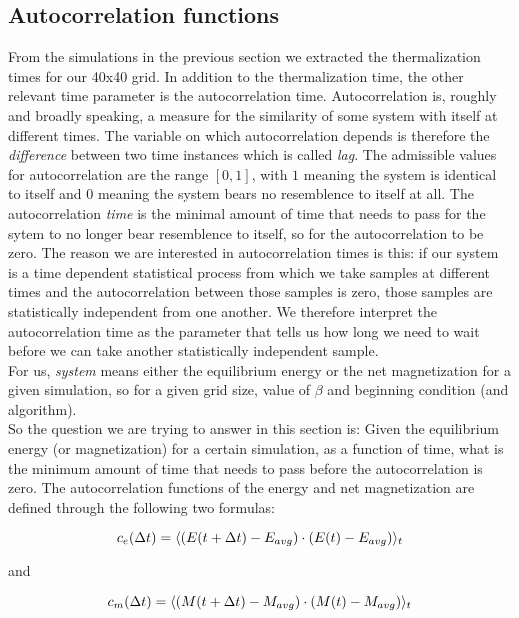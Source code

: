\documentclass[11pt,a4paper]{article}
\DeclarePairedDelimiter{\avg}{\langle}{\rangle}
\begin{document}
\subsection{Autocorrelation functions}
From the simulations in the previous section we extracted the thermalization times for our 40x40 grid. In addition to the thermalization
 time, the other relevant time parameter is the autocorrelation time. Autocorrelation is, roughly and broadly speaking, a measure for the
 similarity of some system with itself at different times. The variable on which autocorrelation depends is therefore the \textit{difference}
 between two time instances which is called \textit{lag}. The admissible values for autocorrelation are the range $[0,1]$, with $1$ meaning
 the system is identical to itself and $0$ meaning the system bears no resemblence to itself at all.
 The autocorrelation \textit{time} is the minimal amount of time that needs to pass for the sytem to no
 longer bear resemblence to itself, so for the autocorrelation to be zero. The reason we are interested in autocorrelation times is this:
 if our system is a time dependent statistical process from which we
 take samples at different times and the autocorrelation between those samples is zero, those samples are statistically independent from 
 one another. We therefore interpret the autocorrelation time as the parameter that tells us how long we need to wait before we can take
 another statistically independent sample. 
 \\ 
 

 For us, \textit{system} means either the equilibrium energy or the net magnetization for a given simulation, so for a given grid 
 size, value of $\beta$ and beginning condition (and algorithm). \\
 So the question we are trying to answer in this section is: Given the equilibrium energy (or magnetization) for a certain simulation, as a
 function of time, what is the minimum amount of time that needs to pass before the autocorrelation is zero. 
 The autocorrelation functions of the energy and net magnetization are defined through the following two formulas:

\begin{equation*}
    c_e(\Delta t) = \avg{(E(t+\Delta t) - E_{avg})\cdot (E(t)-E_{avg})}_t
\end{equation*}

and

\begin{equation*}
    c_m(\Delta t) = \avg{(M(t+\Delta t) - M_{avg})\cdot (M(t)-M_{avg})}_t
\end{equation*}
\end{document}
